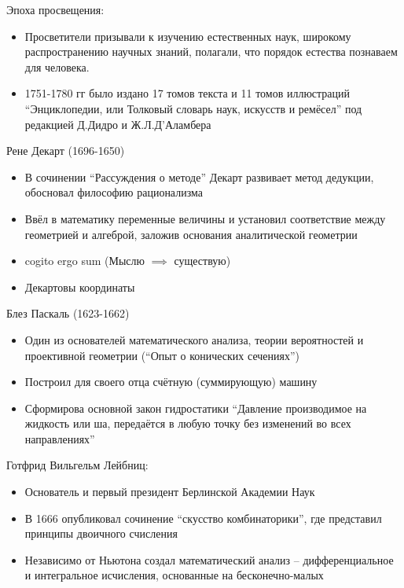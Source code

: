\documentclass{book}
\theoremstyle{definition}
\begin{document}
    Эпоха просвещения:
    \begin{itemize}
        \item Просветители призывали к изучению естественных наук, широкому распространению научных знаний, полагали, что порядок естества познаваем для человека.
        \item 1751-1780 гг было издано 17 томов текста и 11 томов иллюстраций ``Энциклопедии, или Толковый словарь наук, искусств и ремёсел'' под редакцией Д.Дидро и Ж.Л.Д'Аламбера
    \end{itemize}

    Рене Декарт (1696-1650)
    \begin{itemize}
        \item В сочинении ``Рассуждения о методе'' Декарт развивает метод дедукции, обосновал философию рационализма
        \item Ввёл в математику переменные величины и установил соответствие между геометрией и алгеброй, заложив основания аналитической геометрии
        \item cogito ergo sum (Мыслю $\implies $ существую)
        \item Декартовы координаты
    \end{itemize}

    Блез Паскаль (1623-1662)
    \begin{itemize}
        \item Один из основателей математического анализа, теории вероятностей и проективной геометрии (``Опыт о конических сечениях'')
        \item Построил для своего отца счётную (суммирующую) машину
        \item Сформирова основной закон гидростатики ``Давление производимое на жидкость или ша, передаётся в любую точку без изменений во всех направлениях''
    \end{itemize}

    Готфрид Вильгельм Лейбниц:
    \begin{itemize}
        \item Основатель и первый президент Берлинской Академии Наук
        \item В 1666 опубликовал сочинение ``скусство комбинаторики'', где представил принципы двоичного счисления
        \item Независимо от Ньютона  создал математический анализ -- дифференциальное и интегральное исчисления, основанные на бесконечно-малых
    \end{itemize}
\end{document}

